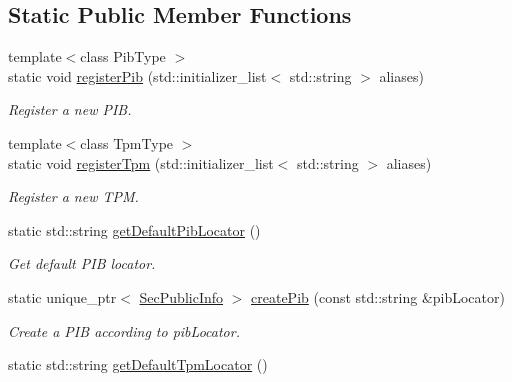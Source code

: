 \subsection*{Static Public Member Functions}
\begin{DoxyCompactItemize}
\item 
{\footnotesize template$<$class Pib\+Type $>$ }\\static void \hyperlink{classndn_1_1security_1_1KeyChain_a97ebf80fef5de44852175f30e8efb60b}{register\+Pib} (std\+::initializer\+\_\+list$<$ std\+::string $>$ aliases)
\begin{DoxyCompactList}\small\item\em Register a new P\+IB. \end{DoxyCompactList}\item 
{\footnotesize template$<$class Tpm\+Type $>$ }\\static void \hyperlink{classndn_1_1security_1_1KeyChain_afed4b5a5b8016753c99a11a44094a92c}{register\+Tpm} (std\+::initializer\+\_\+list$<$ std\+::string $>$ aliases)
\begin{DoxyCompactList}\small\item\em Register a new T\+PM. \end{DoxyCompactList}\item 
static std\+::string \hyperlink{classndn_1_1security_1_1KeyChain_a5241f8ebb00bb8d0f837987fda9e1e05}{get\+Default\+Pib\+Locator} ()\hypertarget{classndn_1_1security_1_1KeyChain_a5241f8ebb00bb8d0f837987fda9e1e05}{}\label{classndn_1_1security_1_1KeyChain_a5241f8ebb00bb8d0f837987fda9e1e05}

\begin{DoxyCompactList}\small\item\em Get default P\+IB locator. \end{DoxyCompactList}\item 
static unique\+\_\+ptr$<$ \hyperlink{classndn_1_1SecPublicInfo}{Sec\+Public\+Info} $>$ \hyperlink{classndn_1_1security_1_1KeyChain_a1a418fc5d43110ecd7e4af26c4f97a73}{create\+Pib} (const std\+::string \&pib\+Locator)\hypertarget{classndn_1_1security_1_1KeyChain_a1a418fc5d43110ecd7e4af26c4f97a73}{}\label{classndn_1_1security_1_1KeyChain_a1a418fc5d43110ecd7e4af26c4f97a73}

\begin{DoxyCompactList}\small\item\em Create a P\+IB according to {\ttfamily pib\+Locator}. \end{DoxyCompactList}\item 
static std\+::string \hyperlink{classndn_1_1security_1_1KeyChain_adac28dc851d03104b948b343a89090c9}{get\+Default\+Tpm\+Locator} ()\hypertarget{classndn_1_1security_1_1KeyChain_adac28dc851d03104b948b343a89090c9}{}\label{classndn_1_1security_1_1KeyChain_adac28dc851d03104b948b343a89090c9}


\end{DoxyCompactItemize}
